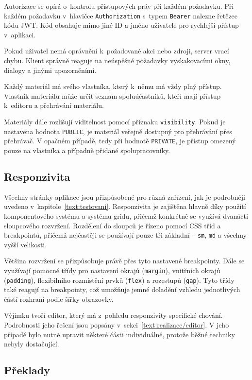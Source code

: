 Autorizace se opírá o~kontrolu přístupových práv při každém požadavku. 
Při každém požadavku v~hlavičce \texttt{Authorization} s~typem \texttt{Bearer} nalezne řetězec kódu JWT.
Kód obsahuje mimo jiné ID a jméno uživatele pro rychlejší přístup v~aplikaci.

Pokud uživatel nemá oprávnění k~požadované akci nebo zdroji, server vrací chybu. 
Klient správně reaguje na neúspěšné požadavky vyskakovacími okny, dialogy a jinými upozorněními.

Každý materiál má svého vlastníka, který k~němu má vždy plný přístup. 
Vlastník materiálu může určit seznam spoluúčastníků, kteří mají přístup k~editoru a přehrávání materiálu.

Materiály dále rozlišují viditelnost pomocí příznaku \texttt{visibility}. 
Pokud je nastavena hodnota \texttt{PUBLIC}, je materiál veřejně dostupný pro přehrávání přes přehrávač. 
V opačném případě, tedy při hodnotě \texttt{PRIVATE}, je přístup omezený pouze na vlastníka a případně přidané spolupracovníky.

\subsection{Responzivita}\label{text:realizace/responzivita}


Všechny stránky aplikace jsou přizpůsobené pro různá zařízení, jak je podrobněji uvedeno v~kapitole~\ref{text:testovani}. 
Responzivita je zajištěna hlavně díky použití komponentového systému a systému gridu, přičemž konkrétně se využívá dvanácti sloupcového rozvržení. 
Rozdělení do sloupců je řízeno pomocí CSS tříd a breakpointů, přičemž nejčastěji se používají pouze tři základní -- \texttt{sm}, \texttt{md} a všechny vyšší velikosti.

Většina rozvržení se přizpůsobuje právě přes tyto nastavené breakpointy. 
Dále se využívají pomocné třídy pro nastavení okrajů (\texttt{margin}), vnitřních okrajů (\texttt{padding}), flexibilního rozmístění prvků (\texttt{flex}) a rozestupů (\texttt{gap}). 
Tyto třídy také reagují na breakpointy, což umožňuje jemné doladění vzhledu jednotlivých částí rozhraní podle šířky obrazovky.

Výjimku tvoří editor, který má z~pohledu responzivity specifické chování. 
Podrobnosti jeho řešení jsou popsány v~sekci~\ref{text:realizace/editor}. 
V jeho případě bylo nutné upravit některé části individuálně, protože běžné techniky nebyly dostačující.

\subsection{Překlady}

